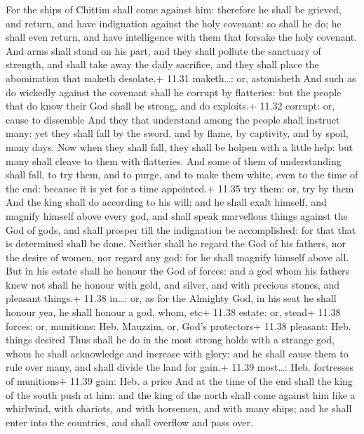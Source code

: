  For the ships of Chittim shall come against him:
therefore he shall be grieved, and return, and have indignation against
the holy covenant: so shall he do; he shall even return, and have
intelligence with them that forsake the holy covenant.  And
arms shall stand on his part, and they shall pollute the sanctuary of
strength, and shall take away the daily sacrifice, and they shall place
the abomination that maketh desolate.+ 11.31 maketh\ldots: or,
astonisheth  And such as do wickedly against the covenant
shall he corrupt by flatteries: but the people that do know their God
shall be strong, and do exploits.+ 11.32 corrupt: or, cause to dissemble
 And they that understand among the people shall instruct
many: yet they shall fall by the sword, and by flame, by captivity, and
by spoil, many days.  Now when they shall fall, they shall
be holpen with a little help: but many shall cleave to them with
flatteries.  And some of them of understanding shall fall,
to try them, and to purge, and to make them white, even to the time of
the end: because it is yet for a time appointed.+ 11.35 try them: or,
try by them  And the king shall do according to his will;
and he shall exalt himself, and magnify himself above every god, and
shall speak marvellous things against the God of gods, and shall prosper
till the indignation be accomplished: for that that is determined shall
be done.  Neither shall he regard the God of his fathers,
nor the desire of women, nor regard any god: for he shall magnify
himself above all.  But in his estate shall he honour the
God of forces: and a god whom his fathers knew not shall he honour with
gold, and silver, and with precious stones, and pleasant things.+ 11.38
in\ldots: or, as for the Almighty God, in his seat he shall honour yea,
he shall honour a god, whom, etc+ 11.38 estate: or, stead+ 11.38 forces:
or, munitions: Heb. Mauzzim, or, God's protectors+ 11.38 pleasant: Heb.
things desired  Thus shall he do in the most strong holds
with a strange god, whom he shall acknowledge and increase with glory:
and he shall cause them to rule over many, and shall divide the land for
gain.+ 11.39 most\ldots: Heb. fortresses of munitions+ 11.39 gain: Heb.
a price  And at the time of the end shall the king of the
south push at him: and the king of the north shall come against him like
a whirlwind, with chariots, and with horsemen, and with many ships; and
he shall enter into the countries, and shall overflow and pass over.
